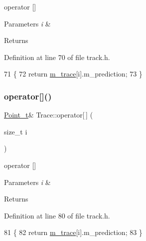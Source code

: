 operator \mbox{[}\mbox{]} 


\begin{DoxyParams}{Parameters}
{\em i} & \\
\hline
\end{DoxyParams}
\begin{DoxyReturn}{Returns}

\end{DoxyReturn}


Definition at line 70 of file track.\+h.


\begin{DoxyCode}
71     \{
72         \textcolor{keywordflow}{return} \mbox{\hyperlink{class_trace_a2650850103966a19b5cbac6db8df8b66}{m\_trace}}[i].m\_prediction;
73     \}
\end{DoxyCode}
\mbox{\label{class_trace_a8b3c9ff4a1eef9356c7bd649a2f27cc7}} 
\subsubsection{\texorpdfstring{operator[]()}{operator[]()}\hspace{0.1cm}{\footnotesize\ttfamily [2/2]}}
{\footnotesize\ttfamily \mbox{\hyperlink{defines_8h_a8c42696da8f098b91374a8e8bb84b430}{Point\+\_\+t}}\& Trace\+::operator\mbox{[}$\,$\mbox{]} (\begin{DoxyParamCaption}\item[{size\+\_\+t}]{i }\end{DoxyParamCaption})\hspace{0.3cm}{\ttfamily [inline]}}



operator \mbox{[}\mbox{]} 


\begin{DoxyParams}{Parameters}
{\em i} & \\
\hline
\end{DoxyParams}
\begin{DoxyReturn}{Returns}

\end{DoxyReturn}


Definition at line 80 of file track.\+h.


\begin{DoxyCode}
81     \{
82         \textcolor{keywordflow}{return} \mbox{\hyperlink{class_trace_a2650850103966a19b5cbac6db8df8b66}{m\_trace}}[i].m\_prediction;
83     \}
\end{DoxyCode}
\mbox{\label{class_trace_a407c1b44333105aff314ae6f7f0ab7eb}} 
